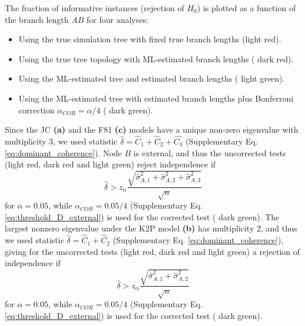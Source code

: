\medskip
The fraction of informative instances (rejection of $H_0$) is plotted as a function of the branch length $AB$ for four analyses:

\medskip

\begin{itemize}
  \item Using the true simulation tree with fixed true branch lengths ({\color{red}light red}).
  \item Using the true tree topology with ML-estimated branch lengths ({\color{burgundy} dark red}).
  \item Using the ML-estimated tree and estimated branch lengths ({\color{applegreen} light green}).
  \item Using the ML-estimated tree with estimated branch lengths plus Bonferroni correction $\alpha_{COR} = \alpha/4$ ({\color{britishracinggreen} dark green}).
\end{itemize}

\medskip

Since the JC \textbf{(a)} and the F81 \textbf{(c)} models have a unique non-zero eigenvalue with multiplicity $3$, we used statistic $\hat{\delta} = \hat{C}_1+\hat{C}_2+\hat{C_3}$ (Supplementary Eq. \ref{eq:dominant_coherence}). Node $B$ is external, and thus the uncorrected tests ({\color{red}light red}, {\color{burgundy} dark red} and {\color{applegreen} light green}) reject independence if 
\begin{equation}
  \hat{\delta} > z_\alpha \frac{
    \sqrt{
      \hat{\sigma}^2_{A,1}+\hat{\sigma}^2_{A,2}+\hat{\sigma}^2_{A,3}
    }
  }{\sqrt{n}}
\end{equation}
for $\alpha=0.05$, while $\alpha_{COR}=0.05/4$ (Supplementary Eq. \ref{eq:threshold_D_external}) is used for the corrected test ({\color{britishracinggreen} dark green}). The largest nonzero eigenvalue under the K2P model \textbf{(b)} has multiplicity $2$, and thus we used statistic $\hat{\delta} = \hat{C}_1+\hat{C}_2$ (Supplementary Eq. \ref{eq:dominant_coherence}), giving for the uncorrected tests ({\color{red}light red}, {\color{burgundy} dark red} and {\color{applegreen} light green}) a rejection of independence if 
\begin{equation}
  \hat{\delta} > z_\alpha \frac{
    \sqrt{
      \hat{\sigma}^2_{A,1}+\hat{\sigma}^2_{A,2}
    }
  }{\sqrt{n}}
\end{equation}
for $\alpha=0.05$, while $\alpha_{COR}=0.05/4$ (Supplementary Eq. \ref{eq:threshold_D_external}) is used for the corrected test ({\color{britishracinggreen} dark green}).


